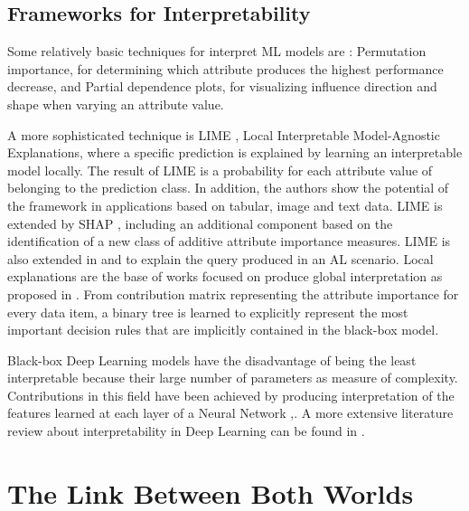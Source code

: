 \subsection{Frameworks for Interpretability}

Some relatively basic techniques for interpret ML models are \cite{Becker2018MachineExplainability}: Permutation importance, for determining which attribute produces the highest performance decrease, and Partial dependence plots, for visualizing influence direction and shape when varying an attribute value.

A more sophisticated technique is LIME \cite{Ribeiro2016}, Local Interpretable Model-Agnostic Explanations, where a specific prediction is explained by learning an interpretable model locally. The result of LIME is a probability for each attribute value of belonging to the prediction class. In addition, the authors show the potential of the framework in applications based on tabular, image and text data. LIME is extended by SHAP \cite{Lundberg2017APredictions}, including an additional component based on the identification of a new class of additive attribute importance measures. LIME is also extended in \cite{Teso2018} and \cite{Phillips2018InterpretableLearning} to explain the query produced in an AL scenario. Local explanations are the base of works focused on produce global interpretation as proposed in \cite{Yang2018}. From contribution matrix representing the attribute importance for every data item, a binary tree is learned to explicitly represent the most important decision rules that are implicitly contained in the black-box model. 

Black-box Deep Learning models have the disadvantage of being the least interpretable because their large number of parameters as measure of complexity. Contributions in this field have been achieved by producing interpretation of the features learned at each layer of a Neural Network \cite{Yosinski2015a},\cite{Olah2018}. A more extensive literature review about interpretability in Deep Learning can be found in \cite{Zhang2018}.

\section{The Link Between Both Worlds}
\label{section2.3}


